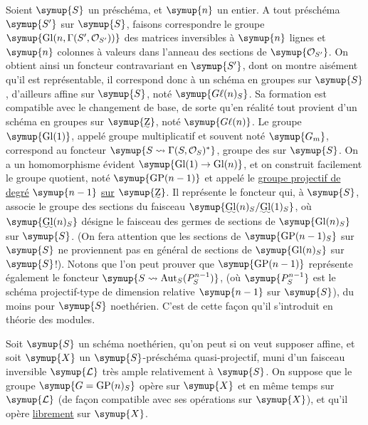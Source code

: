 Soient $\symup{S}$ un préschéma, et $\symup{n}$ un entier. A tout préschéma $\symup{S'}$ sur $\symup{S}$,
faisons correspondre le groupe
$\symup{\operatorname{Gl}(n,\Gamma(S',\mathcal O_{S'}))}$ des matrices inversibles à
$\symup{n}$ lignes et $\symup{n}$ colonnes à valeurs dans l'anneau des sections de
$\symup{\mathcal O_{S'}}$. On obtient ainsi un foncteur contravariant en $\symup{S'}$, dont on
montre aisément qu'il est représentable, il correspond donc à un schéma en
groupes sur $\symup{S}$, d'ailleurs affine sur $\symup{S}$, noté $\symup{G\ell(n)_S}$. Sa
formation est compatible avec le changement de base, de sorte qu'en réalité
tout provient d'un schéma en groupes sur $\symup{\text{\uwave{Z}}}$, noté $\symup{G\ell(n)}$. Le groupe $\symup{\operatorname{Gl}(1)}$, appelé groupe
multiplicatif et souvent noté $\symup{G_m}$, correspond au foncteur
$\symup{S\rightsquigarrow\Gamma(S,\mathcal O_S)^*}$, groupe des  sur $\symup{S}$. On a
un homomorphisme évident $\symup{\operatorname{Gl}(1)\to\operatorname{Gl}(n)}$, et on
construit facilement le groupe quotient, noté $\symup{\operatorname{GP}(n-1)}$ et
appelé le \uline{groupe projectif de degré} $\symup{n-1}$ \uline{sur} $\symup{\text{\uwave{Z}}}$. Il représente
le foncteur qui, à $\symup{S}$, associe le groupe des sections du faisceau
$\symup{\text{\uwave{Gl}}(n)_S/
\text{\uwave{Gl}}(1)_S}$, où
$\symup{\text{\uwave{Gl}}(n)_S}$ désigne le faisceau des germes de sections
de $\symup{\operatorname{Gl}(n)_S}$ sur $\symup{S}$. (On fera attention que les sections de
$\symup{\operatorname{GP}(n-1)_S}$ sur $\symup{S}$ ne proviennent pas en général de sections
de $\symup{\operatorname{Gl}(n)_S}$ sur $\symup{S}$!). Notons que l'on peut prouver que
$\symup{\operatorname{GP}(n-1)}$ représente également le foncteur
$\symup{S\rightsquigarrow\operatorname{Aut}_S(P_S^{n-1})}$, (où
$\symup{P_S^{n-1}}$ est le schéma projectif-type de dimension relative $\symup{n-1}$
sur $\symup{S}$), du moins pour $\symup{S}$ noethérien. C'est de cette façon qu'il s'introduit
en théorie des modules.

Soit $\symup{S}$ un schéma noethérien, qu'on peut si on veut supposer affine, et soit
$\symup{X}$ un $\symup{S}$-préschéma quasi-projectif, muni d'un faisceau inversible $\symup{\mathcal L}$
très ample relativement à $\symup{S}$. On suppose que le groupe
$\symup{G=\operatorname{GP}(n)_S}$ opère sur $\symup{X}$ et en même temps sur $\symup{\mathcal L}$ (de
façon compatible avec ses opérations sur $\symup{X}$), et qu'il opère \uline{librement}
sur $\symup{X}$.

